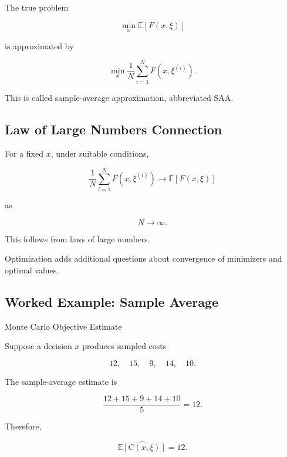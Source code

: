 The true problem

\[
\boxed{
\min_x
\mathbb{E}
[
F(x,\xi)
]
}
\]

is approximated by

\[
\boxed{
\min_x
\frac1N
\sum_{i=1}^{N}
F
(
x,\xi^{(i)}
).
}
\]

This is called sample-average approximation, abbreviated SAA.

\subsection{Law of Large Numbers Connection}
\label{subsec:saa-law-large-numbers}

For a fixed \(x\), under suitable conditions,

\[
\boxed{
\frac1N
\sum_{i=1}^{N}
F
(
x,\xi^{(i)}
)
\to
\mathbb{E}
[
F(x,\xi)
]
}
\]

as

\[
N\to\infty.
\]

This follows from laws of large numbers.

Optimization adds additional questions about convergence of minimizers and
optimal values.

\subsection{Worked Example: Sample Average}
\label{subsec:worked-sample-average}

\begin{workedexamplebox}{Monte Carlo Objective Estimate}

Suppose a decision \(x\) produces sampled costs

\[
12,\quad
15,\quad
9,\quad
14,\quad
10.
\]

The sample-average estimate is

\[
\frac{
12+15+9+14+10
}{
5
}
=
12.
\]

Therefore,

\begin{answerbox}
\[
\boxed{
\widehat{\mathbb{E}[C(x,\xi)]}
=
12.
}
\]
\end{answerbox}

\end{workedexamplebox}

